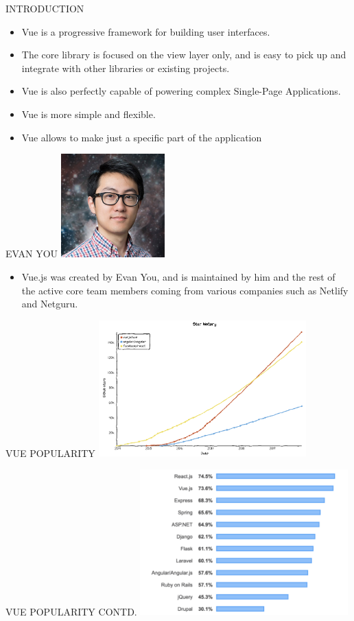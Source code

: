 \documentclass[aspectratio=169, 169]{beamer}
\begin{document}
\begin{frame}{INTRODUCTION}
\justifying
\begin{itemize}
\item Vue is a progressive framework for building user interfaces. 
\item The core library is focused on the view layer only, and is easy to pick up and integrate with other libraries or existing projects.  
\item Vue is also perfectly capable of powering complex Single-Page  Applications.
\item Vue is more simple and flexible.
\item Vue allows to make just a specific part of the application
\end{itemize}
\end{frame}
\begin{frame}{EVAN YOU}
    \center\includegraphics[width=4cm]{evan-you.jpeg}
  \begin{itemize}
      \item  Vue.js was created by Evan You, and is maintained by him and the rest of the active core team members coming from various companies such as Netlify and Netguru.
  \end{itemize}
\end{frame}
\begin{frame}{VUE POPULARITY}
 \center\includegraphics[width=8cm]{vuegithub.png}
\end{frame}
\begin{frame}{VUE POPULARITY CONTD.}
 \center\includegraphics[width=8cm]{vue1.png}
\end{frame}
\end{document}
